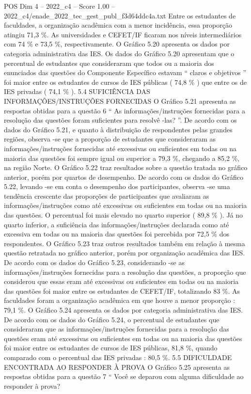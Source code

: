 \begin{textsample}{POS Dim 4 – 2022\_c4 – Score 1.00 – 2022\_c4/enade\_2022\_tec\_gest\_publ\_f3d64ddc4a.txt}
Entre os estudantes de faculdades, a organização acadêmica com a menor incidência, essa proporção atingiu 71,3 \%.
As universidades e CEFET/IF ficaram nos níveis intermediários com 74 \% e 73,5 \%, respectivamente.
O Gráfico 5.20 apresenta os dados por categoria administrativa das IES.
Os dados do Gráfico 5.20 apresentam que o percentual de estudantes que consideraram que todos ou a maioria dos enunciados das questões do Componente Específico estavam “ claros e objetivos ” foi maior entre os estudantes de cursos de IES públicas ( 74,8 \% ) que entre os de IES privadas ( 74,1 \% ). 5.4 SUFICIÊNCIA DAS INFORMAÇÕES/INSTRUÇÕES FORNECIDAS O Gráfico 5.21 apresenta as respostas obtidas para a questão 6 “ As informações/instruções fornecidas para a resolução das questões foram suficientes para resolvê -las? ”.
De acordo com os dados do Gráfico 5.21, e quanto à distribuição de respondentes pelas grandes regiões, observa -se que a proporção de estudantes que consideraram as informações/instruções fornecidas até excessivas ou suficientes em todas ou na maioria das questões foi sempre igual ou superior a 79,3 \%, chegando a 85,2 \%, na região Norte.
O Gráfico 5.22 traz resultados sobre a questão tratada no gráfico anterior, porém por quartos de desempenho.
De acordo com os dados do Gráfico 5.22, levando -se em conta o desempenho dos participantes, observa -se uma tendência crescente das proporções de participantes que avaliaram as informações/instruções como até excessivas ou suficientes em todas ou na maioria das questões.
O percentual foi mais elevado no quarto superior ( 89,8 \% ).
Já no quarto inferior, a suficiência das informações/instruções declarada como até excessiva em todas ou na maioria das questões foi percebida por 72,5 \% dos respondentes.
O Gráfico 5.23 traz outros resultados também em relação à mesma questão retratada no gráfico anterior, porém por organização acadêmica das IES.
De acordo com os dados do Gráfico 5.23, considerando -se as informações/instruções fornecidas para a resolução das questões, a proporção que considerou que essas eram até excessivas ou suficientes em todas ou na maioria das questões foi maior entre os estudantes de CEFET/IF, totalizando 83 \%.
As faculdades foram a organização acadêmica em que houve a menor proporção : 79,1 \%.
O Gráfico 5.24 apresenta os dados por categoria administrativa das IES.
De acordo com os dados do Gráfico 5.24, o percentual de estudantes que consideraram que as informações/instruções fornecidas para a resolução das questões eram até excessivas ou suficientes em todas ou na maioria das questões foi maior entre os estudantes de cursos de IES públicas, 81,8 \%, quando comparado com o percentual das IES privadas : 80,5 \%. 5.5 DIFICULDADE ENCONTRADA AO RESPONDER À PROVA O Gráfico 5.25 apresenta as respostas obtidas para a questão 7 “ Você se deparou com alguma dificuldade ao responder à prova?

\end{textsample}
